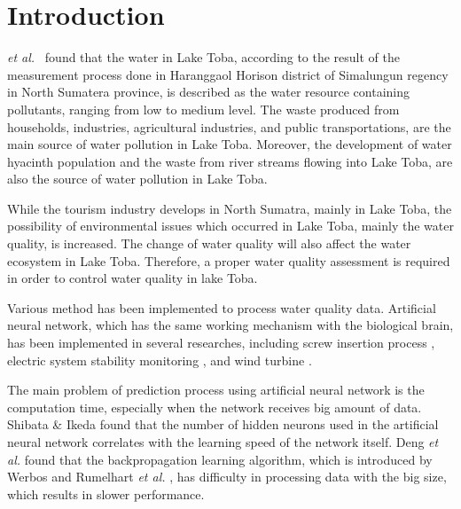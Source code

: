 \documentclass[journal,comsoc]{IEEEtran}
\begin{document}
\section{Introduction}
% 
% 
% 
% 
 {\it et al.} \cite{Haro13} \ found that the water in Lake Toba, according to the result of the measurement process done in Haranggaol Horison district of Simalungun regency in North Sumatera province, is described as the water resource containing pollutants, ranging from low to medium level. The waste produced from households, industries, agricultural industries, and public transportations, are the main source of water pollution in Lake Toba. Moreover, the development of water hyacinth population and the waste from river streams flowing into Lake Toba, are also the source of water pollution in Lake Toba.

While the tourism industry develops in North Sumatra, mainly in Lake Toba, the possibility of environmental issues which occurred in Lake Toba, mainly the water quality, is increased. The change of water quality will also affect the water ecosystem in Lake Toba. Therefore, a proper water quality assessment is required in order to control water quality in lake Toba.

Various method has been implemented to process water quality data. Artificial neural network, which has the same working mechanism with the biological brain, has been implemented in several researches, including screw insertion process \cite{Lara99}, electric system stability monitoring \cite{Popovic98}, and wind turbine \cite{Ata15}.

The main problem of prediction process using artificial neural network is the computation time, especially when the network receives big amount of data. Shibata \& Ikeda \cite{Shibata09} found that the number of hidden neurons used in the artificial neural network correlates with the learning speed of the network itself. Deng \textit{et al.} \cite{Deng15} found that the backpropagation learning algorithm, which is introduced by Werbos \cite{Werbos74} and Rumelhart \textit{et al.} \cite{Rumelhart86}, has difficulty in processing data with the big size, which results in slower performance.
\end{document}

